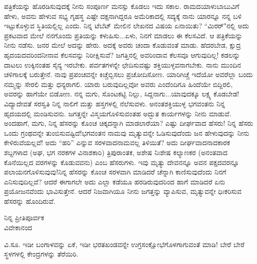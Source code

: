 ಪತ್ರಿಕೆಯನ್ನು ಹೊರಡಿಸುವುದಕ್ಕೆ ನೀನು ಸಂಪೂರ್ಣ ಮನಸ್ಸು ಕೊಡಲು ಇದು ಸಕಾಲ. ರಾಮದಯಾಳುಬಾಬುವಿಗೆ ಹೇಳು, ಅವನು ಹೇಳುವ ಸಭ್ಯ ಗೃಹಸ್ಥ ಎಷ್ಟೇ ದಕ್ಷನಾಗಿದ್ದರೂ ಅಮೆರಿಕಾದಲ್ಲಿ ಸದ್ಯಕ್ಕೆ ನಾನು ಯಾರನ್ನೂ ನನ್ನ ಬಳಿ ಇಟ್ಟುಕೊಳ್ಳುವ ಸ್ಥಿತಿಯಲ್ಲಿಲ್ಲ ಎಂದು. ನಿನ್ನ ಟೆಬೆಟ್ ಮೇಲಿನ ಲೇಖನದ ವಿಷಯ ಏನಾಯಿತು? ``ಮಿರರ್"ನಲ್ಲಿ ಅದು ಪ್ರಕಟವಾದ ಮೇಲೆ ನನಗೊಂದು ಪ್ರತಿಯನ್ನು ಕಳುಹಿಸು...ಏಳು, ನಿನಗೆ ಮಾಡಲು ಈ ಕೆಲಸವಿದೆ. ಆ ಪತ್ರಿಕೆಯನ್ನು ನೀನು ನಡೆಸು. ಜನರ ಮೇಲೆ ಅದನ್ನು ಹೇರು. ಅದಕ್ಕೆ ಅವರು ಚಂದಾ ಕೊಡುವಂತೆ ಮಾಡು. ಹೆದರಬೇಡ, ಕ್ಷುದ್ರ ಹೃದಯದವರಿಂದನೀನಾವ ಕೆಲಸವನ್ನು ನಿರೀಕ್ಷಿಸುವೆ? ಜಗತ್ತಿನಲ್ಲಿ ಅವರಿಂದಾವ ಕೆಲಸವೂ ಆಗುವುದಿಲ್ಲ! ಕಡಲನ್ನು ದಾಟಲು ಉಕ್ಕಿನಂತಹ ಸೈನ್ಯ ಇರಬೇಕು. ಪರ್ವತಗಳನ್ನೇ ಛೇದಿಸುವಷ್ಟು ಶಕ್ತಿಯುಳ್ಳವನಾಗಬೇಕು. ನಾನು ಮುಂದಿನ ಚಳಿಗಾಲಕ್ಕೆ ಬರುತ್ತೇನೆ. ನಾವು ಪ್ರಪಂಚವನ್ನೇ ಕಿಚ್ಚೆಬ್ಬಿಸಲು ಪ್ರಚೋದಿಸೋಣ. ಯಾರಿಗಿಚ್ಚೆ ಇದೆಯೋ ಅವರೆಲ್ಲಾ ಬಂದು ನಮ್ಮನ್ನು ಸೇರಲಿ ಮತ್ತು ಧನ್ಯರಾಗಲಿ. ಯಾರು ಬರುವುದಿಲ್ಲವೋ ಅವರು ಎಂದೆಂದಿಗೂ ಹಿಂದೆಯೇ ಬಿದ್ದಿರಲಿ, ಅವರನ್ನು ಹಾಗೆಯೇ ಬಿಡೋಣ. ನನ್ನ ಮಗು, ಸೊಂಟಕಟ್ಟಿ ನಿಲ್ಲು, ಸಿದ್ದನಾಗು...ಯಾವುದಕ್ಕೂ ಲಕ್ಷ್ಯ ಕೊಡಬೇಡ! ವಿದ್ಯಾದೇವತೆ ಸರಸ್ವತಿ ನಿನ್ನ ನಾಲಿಗೆ ಮತ್ತು ಹಸ್ತಗಳಲ್ಲಿ ನೆಲೆಸುವಳು. ಅನಂತಶಕ್ತಿಯುಳ್ಳ ಭಗವಂತನು ನಿನ್ನ ಹೃದಯದಲ್ಲಿ ಮಂಡಿಸುವನು. ಜಗತ್ತನ್ನೇ ವಿಸ್ಮಯಗೊಳಿಸುವಂತಹ ಅದ್ಭುತ ಕಾರ್ಯಗಳನ್ನು ನೀನು ಮಾಡುವೆ. ಅಂದಹಾಗೆ, ಮಗು, ನಿನ್ನ ಹೆಸರನ್ನು ಕೊಂಚ ಚಿಕ್ಕದನ್ನಾಗಿ ಮಾಡಲಾರೆಯಾ? ಎಷ್ಟು ದೀರ್ಘವಾದ ಹೆಸರು! ನಿನ್ನ ಹೆಸರು ಒಂದು ಗ್ರಂಥವನ್ನೇ ತುಂಬಿಸುವಷ್ಟಿದೆ!ಭಗವಂತನ ನಾಮವು ಮೃತ್ಯುವನ್ನೇ ಓಡಿಸುವುದೆಂದು ಜನ ಹೇಳುವುದನ್ನು ನೀನು ಕೇಳಿರುವೆಯಲ್ಲವೆ! ಅದು ``ಹರಿ'' ಎನ್ನುವ ಸರಳವಾದನಾಮವಲ್ಲ ತಿಳಿಯಿತೆ? ಅದು ದೀರ್ಘವಾದನಾದಕಾರಕ ಶಬ್ದಗಳಾದ\enginline{-} (ಅಘ, ಭಗ ನರಕಗಳ ವಿನಾಶಕಾರಿ) ತ್ರಿಪುರಾಂತಕ, ಅಶೇಷ ನಿಃಶೇಷ ಕಲ್ಯಾಣಕರ (ಅನಂತವಾದ ಕೊನೆಯಿಲ್ಲದ ವರಗಳನ್ನು ಕೊಡುವವನು) ಎಂಬ ಹೆಸರುಗಳು. ಇವು ಮೃತ್ಯು ದೇವನನ್ನೂ ಅವನ ಪಕ್ಷದವರನ್ನೂ ಪಲಾಯನಗೊಳಿಸುವುವು!ನಿನ್ನ ಹೆಸರನ್ನು ಕೊಂಚ ಸರಳವಾಗಿ ಮಾಡಿದರೆ ಚೆನ್ನಾಗಿ ಕಾಣಿಸುವುದೆಂದು ನಿನಗೆ ಎನಿಸುವುದಿಲ್ಲವೆ? ಆದರೆ ಈಗಾಗಲೇ ಅದು ಎಲ್ಲಾ ಕಡೆಯೂ ಹರಡಿರುವುದರಿಂದ ಹಾಗೆ ಮಾಡಿದರೆ ಏನು ಪ್ರಯೋಜನವೆಂದು ಭಾವಿಸುತ್ತೇನೆ. ಆದರೆ ನಿಜವಾಗಿಯೂ ನೀನು ಜಗತ್ತನ್ನು ವ್ಯಾಪಿಸುವ, ಮೃತ್ಯುವನ್ನೇ ಧಿಃಕರಿಸುವ ಹೆಸರನ್ನು ಹೊಂದಿರುವೆ.

\vspace{-0.5cm}

\begin{flushright}
ನಿನ್ನ ಪ್ರೀತಿಪೂರ್ವಕ\\ವಿವೇಕಾನಂದ
\end{flushright}

\vspace{-0.3cm}

\vspace{0.1cm}

ವಿ.ಸೂ.\enginline{-} ಇಡೀ ಬಂಗಾಳವನ್ನು ಏಕೆ, ಇಡೀ ಭರತಖಂಡವನ್ನೇ ಉಗ್ರಸಂಕ್ಷೋಭೆಗೊಳಗಾಗುವಂತೆ ಮಾಡಿ! ಬೇರೆ ಬೇರೆ ಸ್ಥಳಗಳಲ್ಲಿ ಕೇಂದ್ರಗಳನ್ನು ತೆರೆಯಿರಿ.

\vspace{0.1cm}

